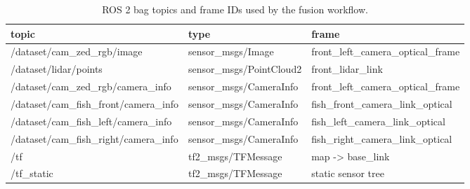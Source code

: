 \begin{table}[t]
\centering
\small
\begin{tabular}{lll}
\hline
topic & type & frame \\
\hline
/dataset/cam\_zed\_rgb/image & sensor\_msgs/Image & front\_left\_camera\_optical\_frame \\
/dataset/lidar/points & sensor\_msgs/PointCloud2 & front\_lidar\_link \\
/dataset/cam\_zed\_rgb/camera\_info & sensor\_msgs/CameraInfo & front\_left\_camera\_optical\_frame \\
/dataset/cam\_fish\_front/camera\_info & sensor\_msgs/CameraInfo & fish\_front\_camera\_link\_optical \\
/dataset/cam\_fish\_left/camera\_info & sensor\_msgs/CameraInfo & fish\_left\_camera\_link\_optical \\
/dataset/cam\_fish\_right/camera\_info & sensor\_msgs/CameraInfo & fish\_right\_camera\_link\_optical \\
/tf & tf2\_msgs/TFMessage & map -> base\_link \\
/tf\_static & tf2\_msgs/TFMessage & static sensor tree \\
\hline
\end{tabular}
\caption{ROS 2 bag topics and frame IDs used by the fusion workflow.}
\label{tab:T7_ros_topics_frames}
\end{table}

